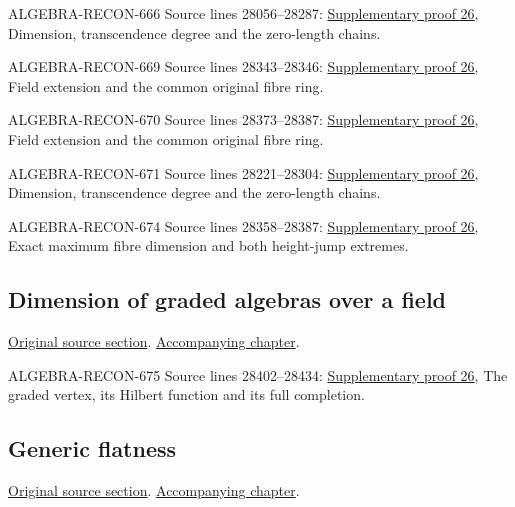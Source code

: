 \begin{AlgebraSourceRoutes}
\item[ALGEBRA-RECON-666] Source lines 28056--28287: \hyperlink{algebra_noether_dimension_notes_20260928}{Supplementary proof 26}, Dimension, transcendence degree and the zero-length chains.
\item[ALGEBRA-RECON-669] Source lines 28343--28346: \hyperlink{algebra_noether_dimension_notes_20260928}{Supplementary proof 26}, Field extension and the common original fibre ring.
\item[ALGEBRA-RECON-670] Source lines 28373--28387: \hyperlink{algebra_noether_dimension_notes_20260928}{Supplementary proof 26}, Field extension and the common original fibre ring.
\item[ALGEBRA-RECON-671] Source lines 28221--28304: \hyperlink{algebra_noether_dimension_notes_20260928}{Supplementary proof 26}, Dimension, transcendence degree and the zero-length chains.
\item[ALGEBRA-RECON-674] Source lines 28358--28387: \hyperlink{algebra_noether_dimension_notes_20260928}{Supplementary proof 26}, Exact maximum fibre dimension and both height-jump extremes.
\end{AlgebraSourceRoutes}

\subsection{Dimension of graded algebras over a field}
\hypertarget{algebra-source-section-dimension-graded}{}
\noindent\href{https://github.com/stacks/stacks-project/blob/a04446e57ec1fbc252a871afcec7752fb2807b14/algebra.tex\#L28395}{Original source section}. \href{algebra.pdf\#nameddest=section-dimension-graded}{Accompanying chapter}.

\begin{AlgebraSourceRoutes}
\item[ALGEBRA-RECON-675] Source lines 28402--28434: \hyperlink{algebra_noether_dimension_notes_20260928}{Supplementary proof 26}, The graded vertex, its Hilbert function and its full completion.
\end{AlgebraSourceRoutes}

\subsection{Generic flatness}
\hypertarget{algebra-source-section-generic-flatness}{}
\noindent\href{https://github.com/stacks/stacks-project/blob/a04446e57ec1fbc252a871afcec7752fb2807b14/algebra.tex\#L28448}{Original source section}. \href{algebra.pdf\#nameddest=section-generic-flatness}{Accompanying chapter}.

